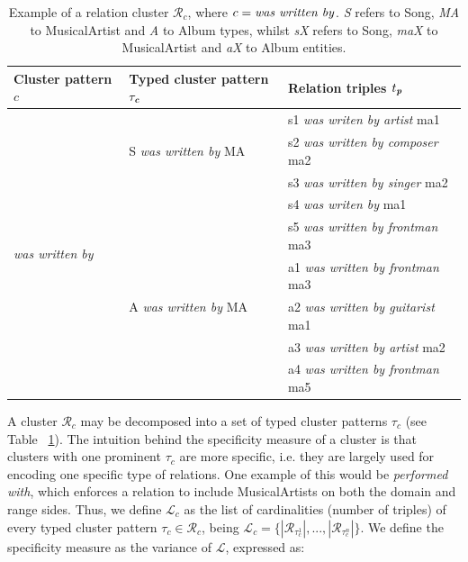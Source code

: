 \begin{table}[]
\scriptsize
	\begin{tabular}{ | l | l | l | }
	\hline
\textbf{Cluster pattern $c$} & \textbf{Typed cluster pattern $ \tau_\textbf{\textit{c}}$} & \textbf{Relation triples $t_\textbf{\textit{p}}$} \\
\hline
\multirow{10}{*}{\textit{was written by}} & \multirow{3}{*}{S \textit{was written by} MA} & s1 \textit{was writen by artist} ma1 \\
\cline{3-3}
 &  & s2 \textit{was written by composer} ma2 \\
\cline{3-3}
 &  & s3 \textit{was written by singer} ma2 \\
\cline{3-3}
&  & s4 \textit{was writen by} ma1 \\
 \cline{3-3}
&  & s5 \textit{was written by frontman} ma3 \\
\cline{2-3}
& \multirow{3}{*}{A \textit{was written by} MA} & a1 \textit{was written by frontman} ma3 \\
 \cline{3-3}
&  & a2 \textit{was written by guitarist} ma1 \\
\cline{3-3}
&  & a3 \textit{was written by artist} ma2 \\
\cline{3-3}
&  & a4 \textit{was written by frontman} ma5 \\
    \hline
	\end{tabular}
	\caption[Example of a relation cluster.]{Example of a relation cluster $\mathcal{R}_c$, where $c = \mbox{\textit{was written by}}$. \textit{S} refers to Song, \textit{MA} to MusicalArtist and \textit{A} to Album types, whilst \textit{sX} refers to Song, \textit{maX} to MusicalArtist and \textit{aX} to Album entities.}
	\label{tbl:kb:example_grouping}
\end{table}

A cluster $\mathcal{R}_c$ may be decomposed into a set of typed cluster patterns $\tau_c$ (see Table ~\ref{tbl:kb:example_grouping}). The intuition behind the specificity measure of a cluster is that clusters with one prominent $\tau_c$ are more specific, i.e. they are largely used for encoding one specific type of relations. One example of this would be \textit{performed with}, which enforces a relation to include MusicalArtists on both the domain and range sides. Thus, we define $\mathcal{L}_c$ as the list of cardinalities (number of triples) of every typed cluster pattern $\tau_c \in \mathcal{R}_c$, being $\mathcal{L}_c = \{|\mathcal{R}_{\tau_c^1}|,...,|\mathcal{R}_{\tau_c^n}|\}$. We define the specificity measure as the variance of $\mathcal{L}$, expressed as:

